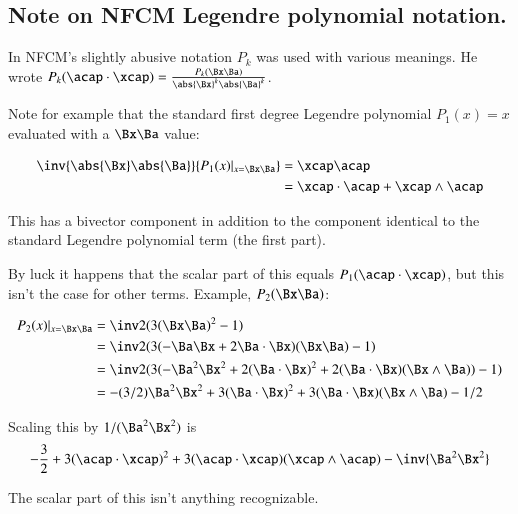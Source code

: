 \subsection{ Note on NFCM Legendre polynomial notation. }

In NFCM's slightly abusive notation $P_k$ was used with various meanings.  He wrote $P_k(\costheta) = \frac{P_k(\bxa)}{\abs{\Bx}^k \abs{\Ba}^k}$.

Note for example that the standard first degree Legendre polynomial $P_1(x) = x$ evaluated with a $\bxa$ value:

\begin{align*}
\inv {\abs{\Bx}\abs{\Ba}} {P_1(x) \vert_{x=\bxa}} &= \xcap \acap \\
&= \xcap \cdot \acap + \xcap \wedge \acap \\
\end{align*}

This has a bivector component in addition to the component identical to the standard Legendre polynomial
term (the first part).

By luck it happens that the scalar part of this equals $P_1(\costheta)$, but this
isn't the case for other terms.  Example, $P_2(\bxa)$:

\begin{align*}
{P_2(x) \vert_{x=\bxa}} 
&= \half( 3(\Bx \Ba)^2 - 1 ) \\
&= \half( 3(-\Ba \Bx + 2 \Ba \cdot \Bx )(\Bx \Ba) - 1 ) \\
&= \half( 3(-\Ba^2 \Bx^2 + 2(\Ba \cdot \Bx)^2 + 2(\Ba \cdot \Bx)(\Bx \wedge \Ba)) - 1 ) \\
&=  -(3/2)\Ba^2 \Bx^2 + 3(\Ba \cdot \Bx)^2 + 3(\Ba \cdot \Bx)(\Bx \wedge \Ba) - 1/2  \\
\end{align*}

Scaling this by $1/(\Ba^2\Bx^2)$ is
\[
-\frac{3}{2} + 3(\costheta)^2 + 3(\costheta)(\xcap \wedge \acap) - \inv{\Ba^2\Bx^2} \\
\]

The scalar part of this isn't anything recognizable.
